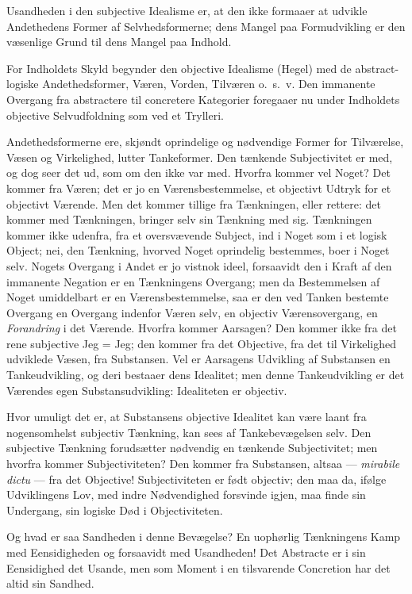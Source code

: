 \documentclass[12pt]{book}
\newcommand{\opage}[1]{\marginnote{\footnotesize\textit{[#1]}}}
\begin{document}
Usandheden i den subjective Idealisme er, at den ikke formaaer at
udvikle Andethedens Former af Selvhedsformerne; dens Mangel paa
Formudvikling er den væsenlige Grund til dens Mangel paa Indhold.

For Indholdets Skyld begynder den objective Idealisme (Hegel) med de
abstract-logiske Andethedsformer, Væren, Vorden, Tilværen o.~s.~v.
Den immanente Overgang fra abstractere til concretere Kategorier
foregaaer nu under Indholdets objective Selvudfoldning som ved et
Trylleri.

Andethedsformerne ere, skjøndt oprindelige og nødvendige Former for
Tilværelse, Væsen og Virkelighed, lutter Tankeformer. Den tænkende
Subjectivitet er med, og dog seer det ud, som om den ikke var med.
Hvorfra kommer vel Noget? Det kommer fra Væren; det er jo en
Værensbestemmelse, et objectivt Udtryk for et objectivt Værende. Men
det kommer tillige fra Tænkningen, eller rettere: det kommer med
Tænkningen, bringer selv sin Tænkning med sig. Tænkningen kommer
ikke udenfra, fra et oversvævende Subject, ind i Noget som i et
logisk Object; nei, den Tænkning, hvorved Noget oprindelig
bestemmes, boer i Noget selv. Nogets Overgang i Andet er jo vistnok
ideel, forsaavidt den i Kraft af den immanente Negation er en
Tænkningens Overgang; men da Bestemmelsen af Noget umiddelbart er en
Værensbestemmelse, saa er den ved Tanken bestemte Overgang en
Overgang indenfor Væren selv, en objectiv Værensovergang, en
\emph{Forandring} i det Værende. Hvorfra kommer Aarsagen? Den kommer
ikke fra det rene subjective Jeg = Jeg; den kommer fra det
Objective, fra det til Virkelighed udviklede Væsen, fra Substansen.
Vel er Aarsagens Udvikling af Substansen en Tankeudvikling, og deri
bestaaer dens Idealitet; men denne Tankeudvikling er det Værendes
egen Substansudvikling: Idealiteten er objectiv.

\opage{65} Hvor umuligt det er, at Substansens objective Idealitet kan være
laant fra nogensomhelst subjectiv Tænkning, kan sees af
Tankebevægelsen selv. Den subjective Tænkning forudsætter nødvendig
en tænkende Subjectivitet; men hvorfra kommer Subjectiviteten? Den
kommer fra Substansen, altsaa --- \textit{mirabile dictu} --- fra
det Objective! Subjectiviteten er født objectiv; den maa da, ifølge
Udviklingens Lov, med indre Nødvendighed forsvinde igjen, maa finde
sin Undergang, sin logiske Død i Objectiviteten.

Og hvad er saa Sandheden i denne Bevægelse? En uophørlig Tænkningens
Kamp med Eensidigheden og forsaavidt med Usandheden! Det Abstracte
er i sin Eensidighed det Usande, men som Moment i en tilsvarende
Concretion har det altid sin Sandhed.
\end{document}
